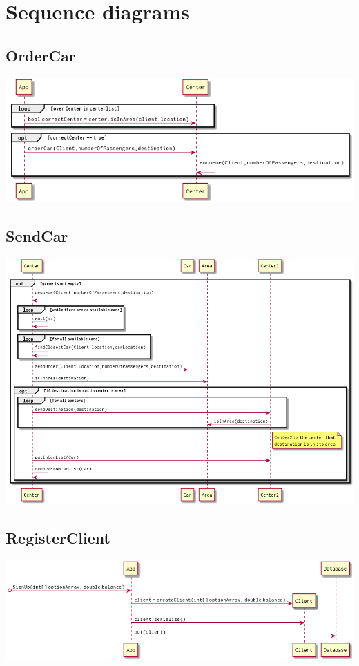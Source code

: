 \documentclass[a4paper]{article}
\begin{document}
\section*{Sequence diagrams}
\subsection*{OrderCar}
\includegraphics[width=1\textwidth]{../Diagrams/orderCar.png}\\
\subsection*{SendCar}
\includegraphics[width=1\textwidth]{../Diagrams/sendCar.png}\\
\subsection*{RegisterClient}
\includegraphics[width=1\textwidth]{../Diagrams/registerClient.png}
\end{document}

